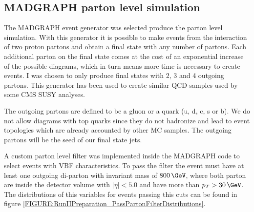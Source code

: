 \subsection{\textsc{MADGRAPH} parton level simulation}
\label{SUBSECTION:RunIIPreparation_MadGraphPartonLevelSimulation}


The \textsc{MADGRAPH} event generator was selected produce the parton level simulation. With this generator it is possible to make events from the interaction of two proton partons and obtain a final state with any number of partons. Each additional parton on the final state comes at the cost of an exponential increase of the possible diagrams, which in turn means more time is necessary to create events. I was chosen to only produce final states with 2, 3 and 4 outgoing partons. This generator has been used to create similar \gls{QCD} samples used by some \gls{CMS} \gls{SUSY} analyses. 

The outgoing partons are defined to be a gluon or a quark (u, d, c, s or b). We do not allow diagrams with top quarks since they do not hadronize and lead to event topologies which are already accounted by other \gls{MC} samples. The outgoing partons will be the seed of our final state jets. 

A custom parton level filter was implemented inside the \textsc{MADGRAPH} code to select events with \gls{VBF} characteristics. To pass the filter the event must have at least one outgoing di-parton with invariant mass of $800\,\GeV$, where both parton are inside the detector volume with $|\eta|<5.0$ and have more than $p_{T}>30\,\GeV$. The distributions of this variables for events passing this cuts can be found in figure \ref{FIGURE:RunIIPreparation_PassPartonFilterDistributions}.

